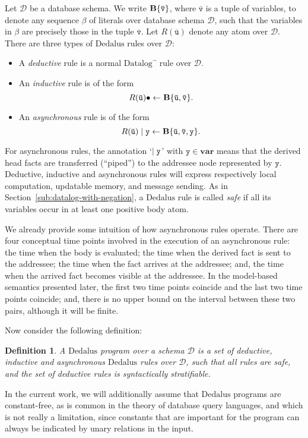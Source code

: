 \documentclass{tlp}
\newtheorem{definition}{Definition}[section]
\newcommand{\langname}[1]{\text{#1}}  \newcommand{\pred}[1]{\mathtt{#1}}  \newcommand{\fname}[1]{\mathit{#1}}  \newcommand{\sq}[1]{`{#1}'}
\newcommand{\dedalus}{\langname{Dedalus}}
\newcommand{\datalogneg}{\langname{Datalog}^{\neg}}
\newcommand{\sch}{\mathcal{D}}
\newcommand{\uvar}{\mathbf{var}}
\newcommand{\var}[1]{\mathtt{#1}}
\newcommand{\tvar}[1]{\mathtt{\bar{#1}}}
\begin{document}
Let $\sch$ be a database schema. We write $\simplebody{\tvar v}$,
where $\tvar v$ is a tuple of variables, to denote any sequence $\beta$
of literals over database schema $\sch$, such that the variables
in $\beta$ are precisely those in the tuple $\tvar v$. Let $R(\tvar u)$
denote any atom over $\sch$. There are three types of $\dedalus$
rules over $\sch$:
\begin{itemize}
\item A \emph{deductive} rule is a normal $\datalogneg$ rule over $\sch$.
\item An \emph{inductive} rule is of the form 
\[
R(\tvar u)\sugind\gets\simplebody{\tvar u,\tvar v}.
\]

\item An \emph{asynchronous} rule is of the form 
\[
R(\tvar u)\sugas{\var y}\gets\simplebody{\tvar u,\tvar v,\var y}.
\]

\end{itemize}
For asynchronous rules, the annotation \sq{$\sugas{\var y}$}
with $\var y\in\uvar$ means that the derived head facts are transferred
(``piped'') to the addressee node represented by $\var y$. Deductive,
inductive and asynchronous rules will express respectively local computation,
updatable memory, and message sending. 
As in Section~\ref{sub:datalog-with-negation},
a $\dedalus$ rule is called \emph{safe} if all its variables occur
in at least one positive body atom. 

We already provide some intuition of how asynchronous rules operate.
There are four conceptual time points involved in the execution of
an asynchronous rule: the time when the body is evaluated; the time
when the derived fact is sent to the addressee; the time when the
fact arrives at the addressee; and, the time when the arrived fact
becomes visible at the addressee. In the model-based semantics presented
later, the first two time points coincide and the last two time points
coincide; and, there is no upper bound on the interval between these
two pairs, although it will be finite.

Now consider the following definition:

\begin{definition}A \emph{$\dedalus$ program over a schema $\sch$}
is a set of deductive, inductive and asynchronous $\dedalus$ rules
over $\sch$, such that all rules are safe, and the set of deductive
rules is syntactically stratifiable.\end{definition} 

In the current work, we will additionally assume that $\dedalus$
programs are constant-free, as is common in the theory of database
query languages, and which is not really a limitation, since constants
that are important for the program can always be indicated by unary
relations in the input.
\end{document}
